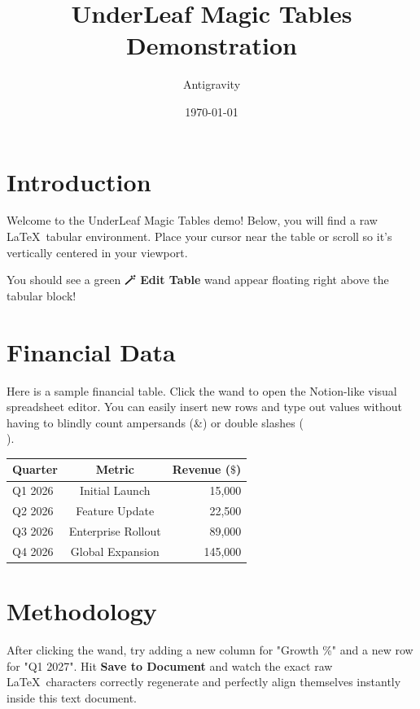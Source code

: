 \documentclass{article}
\title{UnderLeaf Magic Tables Demonstration}
\author{Antigravity}
\date{\today}
\begin{document}
\maketitle

\section{Introduction}

Welcome to the UnderLeaf Magic Tables demo! Below, you will find a raw \LaTeX\ tabular environment. Place your cursor near the table or scroll so it's vertically centered in your viewport. 

You should see a green \textbf{🪄 Edit Table} wand appear floating right above the tabular block!

\section{Financial Data}

Here is a sample financial table. Click the wand to open the Notion-like visual spreadsheet editor. You can easily insert new rows and type out values without having to blindly count ampersands (\&) or double slashes (\\).

\vspace{1em}
\begin{center}
\begin{tabular}{|l|c|r|}
\hline
  Quarter    & Metric                   & Revenue ($\$$) \\
\hline
  Q1 2026    & Initial Launch           & 15,000         \\
  Q2 2026    & Feature Update           & 22,500         \\
  Q3 2026    & Enterprise Rollout       & 89,000         \\
  Q4 2026    & Global Expansion         & 145,000        \\
\hline
\end{tabular}
\end{center}
\vspace{1em}

\section{Methodology}

After clicking the wand, try adding a new column for "Growth \%" and a new row for "Q1 2027". Hit \textbf{Save to Document} and watch the exact raw \LaTeX\ characters correctly regenerate and perfectly align themselves instantly inside this text document.
\end{document}
